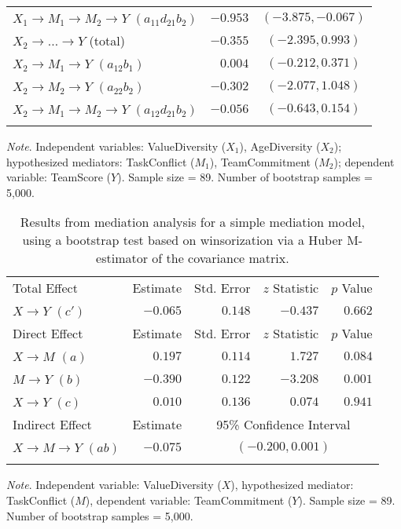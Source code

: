 \documentclass{article}\usepackage[]{graphicx}\usepackage[]{xcolor}
\begin{document}
\begin{table}[h!]
\begin{center}
\begin{tabular}{lrrrr}
$X_{1} \rightarrow M_{1} \rightarrow M_{2} \rightarrow Y$ $(a_{11}d_{21}b_{2})$ & $-0.953$ & \multicolumn{3}{c}{$(-3.875, -0.067)$} \\ 
$X_{2} \rightarrow  \ldots  \rightarrow Y$ (total) & $-0.355$ & \multicolumn{3}{c}{$(-2.395, 0.993)$} \\ 
$X_{2} \rightarrow M_{1} \rightarrow Y$ $(a_{12}b_{1})$ & $0.004$ & \multicolumn{3}{c}{$(-0.212, 0.371)$} \\ 
$X_{2} \rightarrow M_{2} \rightarrow Y$ $(a_{22}b_{2})$ & $-0.302$ & \multicolumn{3}{c}{$(-2.077, 1.048)$} \\ 
$X_{2} \rightarrow M_{1} \rightarrow M_{2} \rightarrow Y$ $(a_{12}d_{21}b_{2})$ & $-0.056$ & \multicolumn{3}{c}{$(-0.643, 0.154)$} \\ 
\noalign{\smallskip}\hline
\end{tabular}
\end{center}
\emph{Note}. Independent variables: ValueDiversity ($X_{1}$), AgeDiversity ($X_{2}$); hypothesized mediators: TaskConflict ($M_{1}$), TeamCommitment ($M_{2}$); dependent variable: TeamScore ($Y$). Sample size = 89. Number of bootstrap samples = 5,000.
\end{table}




\begin{table}[h!]
\caption{Results from mediation analysis for a simple mediation model, using a bootstrap test based on winsorization via a Huber M-estimator of the covariance matrix.}
\begin{center}
\begin{tabular}{lrrrr}
\hline\noalign{\smallskip}
Total Effect & Estimate & Std. Error & $z$ Statistic & $p$ Value \\ 
\noalign{\smallskip}\hline\noalign{\smallskip}
$X \rightarrow Y$ $(c')$ & $-0.065$ & $0.148$ & $-0.437$ & $0.662$ \\ 
\noalign{\smallskip}\hline\noalign{\smallskip}
Direct Effect & Estimate & Std. Error & $z$ Statistic & $p$ Value \\ 
\noalign{\smallskip}\hline\noalign{\smallskip}
$X \rightarrow M$ $(a)$ & $0.197$ & $0.114$ & $1.727$ & $0.084$ \\ 
$M \rightarrow Y$ $(b)$ & $-0.390$ & $0.122$ & $-3.208$ & $0.001$ \\ 
$X \rightarrow Y$ $(c)$ & $0.010$ & $0.136$ & $0.074$ & $0.941$ \\ 
\noalign{\smallskip}\hline\noalign{\smallskip}
Indirect Effect & Estimate & \multicolumn{3}{c}{95\% Confidence Interval} \\ 
\noalign{\smallskip}\hline\noalign{\smallskip}
$X \rightarrow M \rightarrow Y$ $(ab)$ & $-0.075$ & \multicolumn{3}{c}{$(-0.200, 0.001)$} \\ 
\noalign{\smallskip}\hline
\end{tabular}
\end{center}
\emph{Note}. Independent variable: ValueDiversity ($X$), hypothesized mediator: TaskConflict ($M$), dependent variable: TeamCommitment ($Y$). Sample size = 89. Number of bootstrap samples = 5,000.
\end{table}
\end{document}
